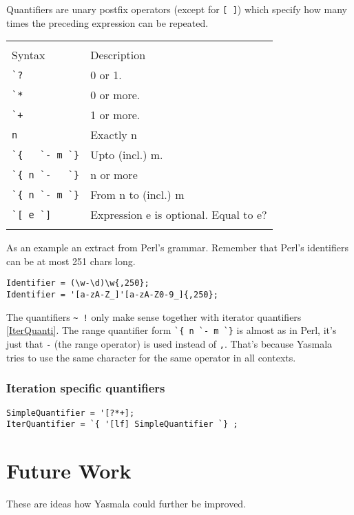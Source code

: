 \documentclass[a4paper]{report}
\begin{document}
Quantifiers are unary postfix operators (except for \verb|[ ]|) which specify
how many times the preceding expression can be repeated. 

\begin{tabular}{p{2cm}p{9.5cm}}
  & \\
Syntax   & Description \\
\verb|`?| & 0 or 1.\\
\verb|`*| & 0 or more.\\
\verb|`+| & 1 or more.\\
\verb|n|  & Exactly n \\
\verb|`{   `- m `}| & Upto (incl.) m. \\
\verb|`{ n `-   `}| & n or more \\
\verb|`{ n `- m `}| & From n to (incl.) m\\
\verb|`[ e `]| & Expression e is optional. Equal to e?\\
  & \\
\end{tabular}

As an example an extract from Perl's grammar. Remember that Perl's identifiers
can be at most 251 chars long.

\begin{verbatim}
Identifier = (\w-\d)\w{,250};
Identifier = '[a-zA-Z_]'[a-zA-Z0-9_]{,250};
\end{verbatim}  

The quantifiers \verb|~ !| only make sense together with iterator quantifiers
\ref{IterQuanti}. The range quantifier form \verb|`{ n `- m `}| is almost as in
Perl, it's just that \verb|-| (the range operator) is used instead of \verb|,|.
That's because Yasmala tries to use the same character for the same operator in
all contexts. 

\label{IterQuanti}
\subsection{Iteration specific quantifiers}
  
\begin{verbatim}
SimpleQuantifier = '[?*+];
IterQuantifier = `{ '[lf] SimpleQuantifier `} ;  
\end{verbatim}


\chapter{Future Work}

These are ideas how Yasmala could further be improved.
\end{document}
